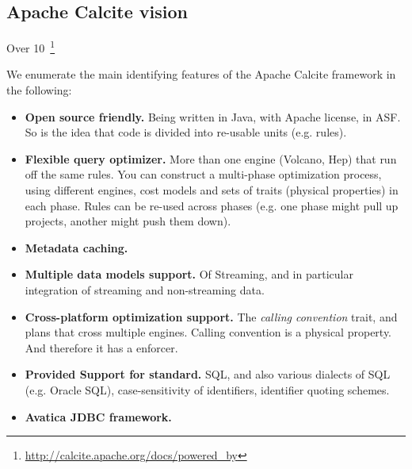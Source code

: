 \subsection{Apache Calcite vision}
\label{subsec:vision}


Over 10~\footnote{\url{http://calcite.apache.org/docs/powered_by}}

We enumerate the main identifying features of the Apache Calcite framework in the following:

\begin{itemize}
	\item\textbf{Open source friendly.} Being written in Java, with Apache license, in ASF. So is the idea that code is divided into re-usable units (e.g. rules).
	\item\textbf{Flexible query optimizer.} More than one engine (Volcano, Hep) that run off the same rules. You can construct a multi-phase optimization process, using different engines, cost models and sets of traits (physical properties) in each phase. Rules can be re-used across phases (e.g. one phase might pull up projects, another might push them down).
	\item\textbf{Metadata caching.}
	\item\textbf{Multiple data models support.} Of Streaming, and in particular integration of streaming and non-streaming data.
	\item\textbf{Cross-platform optimization support.} The \textit{calling convention} trait, and plans that cross multiple engines. Calling convention is a physical property. And therefore it has a enforcer.
	\item\textbf{Provided Support for standard.} SQL, and also various dialects of SQL (e.g. Oracle SQL), case-sensitivity of identifiers, identifier quoting schemes.
	\item\textbf{Avatica JDBC framework.}
\end{itemize}
